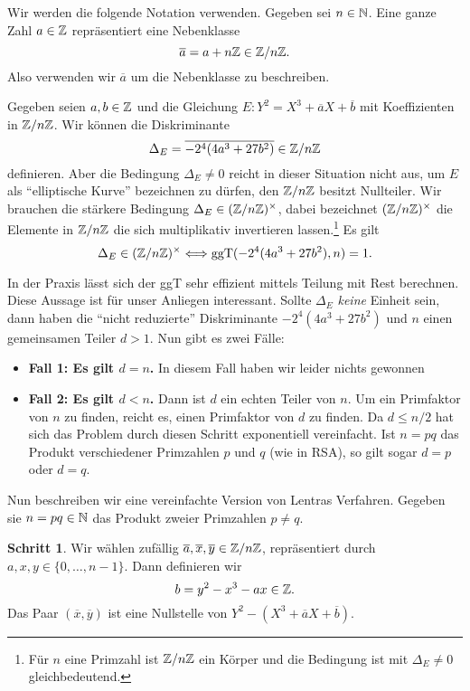 Wir werden die folgende Notation verwenden. Gegeben sei $n\in{\mathbb{N}}$. Eine ganze Zahl $a\in{\mathbb{Z}}$
 repräsentiert eine Nebenklasse
$$
\overline a = a+n{\mathbb{Z}}\in {\mathbb{Z}}/n{\mathbb{Z}}.
$$
Also verwenden wir $\overline a$ um die Nebenklasse zu beschreiben. 

Gegeben seien $a,b\in{\mathbb{Z}}$ und die Gleichung $E : Y^2= X^3+\overline a
X + \overline b$ mit Koeffizienten in ${\mathbb{Z}}/n{\mathbb{Z}}$. Wir können die
Diskriminante
$$\Delta_E = \overline{-2^4(4a^3+27b^2)}\in{\mathbb{Z}}/n{\mathbb{Z}}$$ definieren. Aber die Bedingung $\Delta_E\not=0$
reicht in dieser Situation nicht aus, um $E$ als ``elliptische Kurve''
bezeichnen zu dürfen, den ${\mathbb{Z}}/n{\mathbb{Z}}$ besitzt Nullteiler. Wir brauchen
die stärkere Bedingung $\Delta_E \in ({\mathbb{Z}}/n{\mathbb{Z}})^\times$, dabei
bezeichnet $({\mathbb{Z}}/n{\mathbb{Z}})^\times$ die Elemente in ${\mathbb{Z}}/n{\mathbb{Z}}$ die sich
multiplikativ invertieren lassen.\footnote{Für $n$ eine Primzahl ist ${\mathbb{Z}}/n{\mathbb{Z}}$
ein Körper und die Bedingung ist mit $\Delta_E\not=0$ gleichbedeutend.}
Es gilt
\begin{equation}
  \label{eq:ggTDeltaE}
  \Delta_E \in ({\mathbb{Z}}/n{\mathbb{Z}})^\times\Longleftrightarrow
  \mathrm{ggT}(-2^4(4a^3+27b^2),n) = 1.
\end{equation}

In der Praxis lässt sich der ggT sehr effizient mittels Teilung
mit Rest berechnen. 
Diese Aussage ist für unser Anliegen interessant.  Sollte $\Delta_E$
\emph{keine} Einheit sein, dann haben die ``nicht reduzierte''
Diskriminante $-2^4(4a^3+27b^2)$ und $n$ einen gemeinsamen Teiler
$d>1$. Nun gibt es zwei Fälle:

\begin{itemize}
\item \textbf{Fall 1: Es gilt  $d=n$.}  In diesem Fall haben wir leider
  nichts gewonnen
\item \textbf{Fall 2: Es gilt  $d<n$.}
  Dann ist $d$ ein echten Teiler
  von $n$. Um ein Primfaktor von $n$ zu finden, reicht es, einen
  Primfaktor von $d$ zu finden. Da $d\le n/2$ hat sich das Problem durch
  diesen Schritt exponentiell vereinfacht. Ist $n=pq$ das Produkt verschiedener
  Primzahlen $p$ und $q$ (wie in RSA), so gilt sogar $d=p$ oder $d=q$.
\end{itemize}

Nun beschreiben wir eine vereinfachte Version von Lentras Verfahren.
Gegeben sie $n=pq\in{\mathbb{N}}$
das Produkt zweier Primzahlen $p\not=q$. 

\bigskip
\textbf{Schritt 1}. Wir wählen zufällig $\overline a,\overline
x,\overline y\in{\mathbb{Z}}/n{\mathbb{Z}}$, repräsentiert durch $a,x,y\in \{0,\ldots,n-1\}$. 
Dann definieren wir
$$
b = y^2 - x^3 - ax\in {\mathbb{Z}}.
$$
Das Paar $(\overline x,\overline y)$ ist eine Nullstelle von $Y^2 -
(X^3+\overline a X +\overline b)$.

